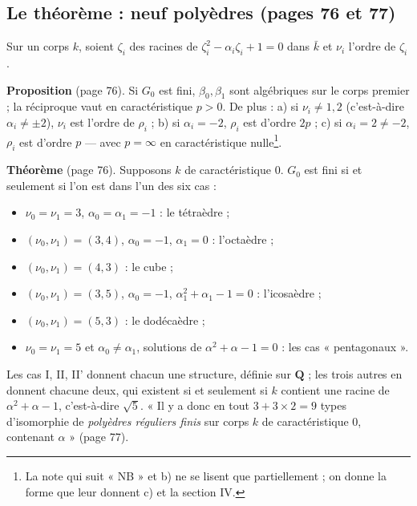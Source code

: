\documentclass[11pt,a4paper]{article}
\begin{document}
\subsection*{Le théorème : neuf polyèdres (pages 76 et 77)}

Sur un corps $k$, soient $\zeta_i$ des racines de $\zeta_i^2 - \alpha_i\zeta_i +
1 = 0$ dans $\bar k$ et $\nu_i$ l'ordre de $\zeta_i$.

\textbf{Proposition} (page 76). Si $G_0$ est fini, $\beta_0, \beta_1$ sont
algébriques sur le corps premier ; la réciproque vaut en caractéristique $p >
0$. De plus : a) si $\nu_i \neq 1, 2$ (c'est-à-dire $\alpha_i \neq \pm 2$),
$\nu_i$ est l'ordre de $\rho_i$ ; b) si $\alpha_i = -2$, $\rho_i$ est d'ordre
$2p$ ; c) si $\alpha_i = 2 \neq -2$, $\rho_i$ est d'ordre $p$ --- avec $p =
\infty$ en caractéristique nulle\footnote{La note qui suit « NB » et b) ne se
lisent que partiellement ; on donne la forme que leur donnent c) et la
section IV.}.

\textbf{Théorème} (page 76). Supposons $k$ de caractéristique $0$. $G_0$ est
fini si et seulement si l'on est dans l'un des six cas :
\begin{itemize}
  \item[I)] $\nu_0 = \nu_1 = 3$, $\alpha_0 = \alpha_1 = -1$ : le tétraèdre ;
  \item[II)] $(\nu_0, \nu_1) = (3, 4)$, $\alpha_0 = -1$, $\alpha_1 = 0$ :
    l'octaèdre ;
  \item[II')] $(\nu_0, \nu_1) = (4, 3)$ : le cube ;
  \item[III)] $(\nu_0, \nu_1) = (3, 5)$, $\alpha_0 = -1$, $\alpha_1^2 + \alpha_1
    - 1 = 0$ : l'icosaèdre ;
  \item[III')] $(\nu_0, \nu_1) = (5, 3)$ : le dodécaèdre ;
  \item[IV)] $\nu_0 = \nu_1 = 5$ et $\alpha_0 \neq \alpha_1$, solutions de
    $\alpha^2 + \alpha - 1 = 0$ : les cas « pentagonaux ».
\end{itemize}
Les cas I, II, II' donnent chacun une structure, définie sur $\mathbf{Q}$ ; les
trois autres en donnent chacune deux, qui existent si et seulement si $k$
contient une racine de $\alpha^2 + \alpha - 1$, c'est-à-dire $\sqrt5$. « Il y a
donc en tout $3 + 3 \times 2 = 9$ types d'isomorphie de \emph{polyèdres réguliers
finis} sur corps $k$ de caractéristique $0$, contenant $\alpha$ »
(page 77).
\end{document}
